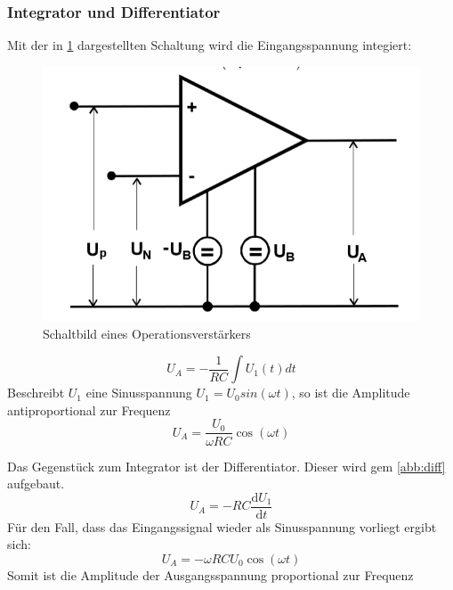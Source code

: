 \subsubsection{Integrator und Differentiator}
Mit der in \ref{abb:int} dargestellten Schaltung wird die Eingangsspannung integiert:
\begin{figure}
 	\centering
 	\includegraphics[width=\textwidth]{img/op.png}
 	\caption{Schaltbild eines Operationsverstärkers \cite{FP}}
 	\label{abb:int}
\end{figure}
\begin{equation}
U_A = - \frac{1}{RC} \int U_1(t)dt
\end{equation}
Beschreibt $U_1$ eine Sinusspannung $U_1 = U_0 sin(\omega t)$, so ist die Amplitude antiproportional zur Frequenz
\begin{equation}
U_A = \frac{U_0}{\omega RC} \cos(\omega t)
\end{equation}

Das Gegenstück zum Integrator ist der Differentiator. Dieser wird gem \ref{abb:diff} aufgebaut.
\begin{equation}
U_A = -RC \frac{\text{d} U_1}{\text{d} t}
\end{equation}
Für den Fall, dass das Eingangssignal wieder als Sinusspannung vorliegt ergibt sich:
\begin{equation}
U_A = -\omega RCU_0 \cos(\omega t)
\end{equation}
Somit ist die Amplitude der Ausgangsspannung proportional zur Frequenz

